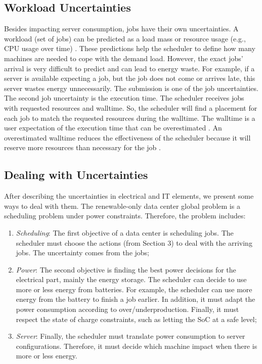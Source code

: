 \subsection{Workload Uncertainties}
Besides impacting server consumption, jobs have their own uncertainties. A workload (set of jobs) can be predicted as a load mass or resource usage (e.g., CPU usage over time) \cite{masdari2020survey, vashistha2020literature}. These predictions help the scheduler to define how many machines are needed to cope with the demand load. However, the exact jobs' arrival is very difficult to predict and can lead to energy waste. For example, if a server is available expecting a job, but the job does not come or arrives late, this server wastes energy unnecessarily. The submission is one of the job uncertainties. The second job uncertainty is the execution time. The scheduler receives jobs with requested resources and walltime. So, the scheduler will find a placement for each job to match the requested resources during the walltime. The walltime is a user expectation of the execution time that can be overestimated \cite{takizawa2020effect}. An overestimated walltime reduces the effectiveness of the scheduler because it will reserve more resources than necessary for the job \cite{srinivasan2002characterization, takizawa2020effect}. 


\subsection{Dealing with Uncertainties}
After describing the uncertainties in electrical and IT elements, we present some ways to deal with them. The renewable-only data center global problem is a scheduling problem under power constraints. Therefore, the problem includes:
\begin{enumerate}
    \item \textit{Scheduling}: The first objective of a data center is scheduling jobs. The scheduler must choose the actions (from Section 3) to deal with the arriving jobs. The uncertainty comes from the jobs;
    \item \textit{Power}: The second objective is finding the best power decisions for the electrical part, mainly the energy storage. The scheduler can decide to use more or less energy from batteries. For example, the scheduler can use more energy from the battery to finish a job earlier. In addition, it must adapt the power consumption according to over/underproduction. Finally, it must respect the state of charge constraints, such as letting the SoC at a safe level;
    \item \textit{Server}: Finally, the scheduler must translate power consumption to server configurations. Therefore, it must decide which machine impact when there is more or less energy.
\end{enumerate}


